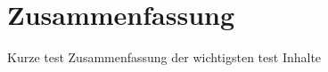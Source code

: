 
\section*{Zusammenfassung}
\label{sec:Zusammenfassung}
Kurze \gls{test} Zusammenfassung der wichtigsten \gls{test} Inhalte
